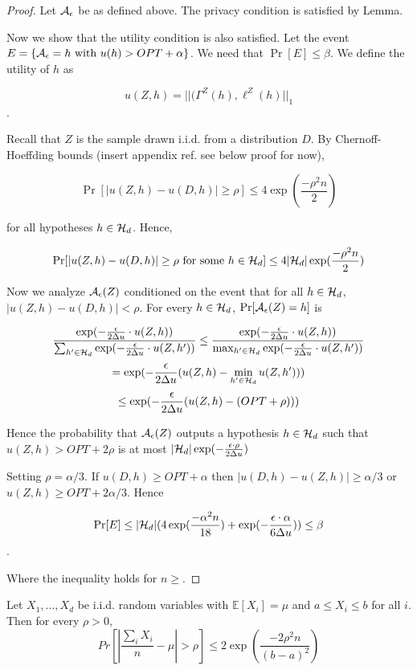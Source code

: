 \begin{proof}
	Let $\mathcal{A}_{\epsilon}$ be as defined above. The privacy condition is
  satisfied by Lemma.

	Now we show that the utility condition is also satisfied. Let the
  event $E = \{\mathcal{A}_{\epsilon} = h \text{ with } u(h) > OPT + \alpha\}$. We
  need that $\Pr[E] \leq \beta$. We define the utility of $h$ as

	$$u(Z,h) = ||(\Gamma^Z(h), \ell^Z(h)||_{1}$$.

	Recall that $Z$ is the sample drawn i.i.d. from a distribution $D$.
  By Chernoff-Hoeffding bounds (insert appendix ref. see below proof
  for now),

	$$\Pr[|u(Z,h) - u(D,h)| \geq \rho] \leq 4\exp(\frac{-\rho^2n}{2})$$

	for all hypotheses $h \in \mathcal{H}_d$. Hence,

	$$\Pr[|u(Z,h) - u(D,h)| \geq \rho \text{ for some } h \in \mathcal{H}_d] \leq 4|\mathcal{H}_d|\exp(\frac{-\rho^2n}{2})$$

	Now we analyze $\mathcal{A}_\epsilon(Z)$ conditioned on the event that for all
  $h\in \mathcal{H}_d$, $|u(Z,h) - u(D,h)| < \rho$. For every $h \in \mathcal{H}_d$, $\Pr[\mathcal{A}_\epsilon(Z) = h]$ is

	$$\frac{\exp(-\frac{\epsilon}{2\Delta u} \cdot
  u(Z,h))}{\sum_{h'\in\mathcal{H}_d}\exp(-\frac{\epsilon}{2\Delta u} \cdot u(Z,h'))}
  \leq \frac{\exp(-\frac{\epsilon}{2\Delta u} \cdot
  u(Z,h))}{\max_{h'\in\mathcal{H}_d}\exp(-\frac{\epsilon}{2\Delta u} \cdot u(Z,h'))} $$
	$$= \exp(-\frac{\epsilon}{2\Delta u}(u(Z,h) - \min_{h'\in\mathcal{H}_d}u(Z,h')))$$
	$$\leq \exp(-\frac{\epsilon}{2\Delta u}(u(Z,h) - (OPT + \rho)))$$

	Hence the probability that $\mathcal{A}_\epsilon(Z)$ outputs a hypothesis $h \in
  \mathcal{H}_d$ such that $u(Z,h) > OPT + 2\rho$ is at most
  $|\mathcal{H}_d|\exp(-\frac{\epsilon\cdot\rho}{2\Delta u})$

	Setting $\rho = \alpha/3$. If $u(D,h) \geq OPT + \alpha$ then
  $|u(D,h) - u(Z,h)| \geq \alpha/3$ or $u(Z,h) \geq OPT + 2\alpha/3$.
  Hence

	$$\Pr[E] \leq |\mathcal{H}_d|(4\exp(\frac{-\alpha^2n}{18}) + \exp(-\frac{\epsilon\cdot\alpha}{6\Delta u})) \leq \beta$$.

	Where the inequality holds for $n \geq $.
\end{proof}
\begin{theorem}
	Let $X_1,...,X_d$ be i.i.d. random variables with $\mathbb{E}[X_i] = \mu$ and $a \leq X_i \leq b$ for all $i$. Then for every $\rho > 0$,
$$Pr[|\frac{\sum_i X_i}{n} - \mu| > \rho] \leq 2\exp(\frac{-2\rho^2n}{(b-a)^2})$$
\end{theorem}

